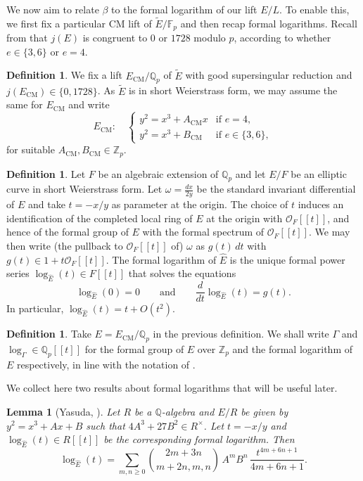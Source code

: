 \documentclass{amsart}
\newcommand{\Qp}{\mathbb{Q}_p}
\newtheorem{lemma}[theorem]{Lemma}
\theoremstyle{definition}
\newtheorem{definition}[theorem]{Definition}
\newcommand{\Z}{\mathbb{Z}}
\newcommand{\Q}{\mathbb{Q}}
\numberwithin{theorem}{section}
\numberwithin{equation}{section}
\begin{document}
We now aim to relate $\beta$ to the formal logarithm of our lift $E/L$. To enable this, we first fix a particular CM lift of $\tilde{E}/\mathbb{F}_p$ and then recap formal logarithms. Recall from  that $j(E)$ is congruent to $0$ or $1728$ modulo $p$, according to whether $e \in \{3,6\}$ or $e=4$.

\begin{definition}
We fix a lift $E_{\mathrm{CM}}/\Qp$ of $\tilde{E}$ with good supersingular reduction and $j(E_{\mathrm{CM}}) \in \{0,1728\}$. As $\tilde{E}$ is in short Weierstrass form, we may assume the same for $E_{\mathrm{CM}}$ and write
\[
E_{\mathrm{CM}}:\quad
\begin{cases}
y^2=x^3+A_{\mathrm{CM}} x & \text{if } e=4,\\
y^2=x^3+B_{\mathrm{CM}}  & \text{if } e \in \{3,6\},
\end{cases}
\]
for suitable $A_{\mathrm{CM}},B_{\mathrm{CM}} \in \Z_p$.
\end{definition}


\begin{definition}\label{def: formal log}
Let $F$ be an algebraic extension of $\Q_p$ and let $E/F$ be an elliptic curve in short Weierstrass form. Let $\omega=\frac{dx}{2y}$ be the standard invariant differential of $E$ and take $t=-x/y$ as parameter at the origin. The choice of $t$ induces an identification of the completed local ring of $E$ at the origin with $\mathcal{O}_F[[t]]$, and hence of the formal group of $E$ with the formal spectrum of $\mathcal{O}_F[[t]]$. We may then write (the pullback to $\mathcal{O}_F[[t]]$ of) $\omega$ as $g(t)\,dt$ with $g(t)\in 1 +t \mathcal{O}_F[[t]]$.
The formal logarithm of $\hat{E}$ is the unique formal power series
$\log_{\widehat{E}}(t)\in F[[t]]$ that solves the equations
\[
\log_{\widehat{E}}(0)=0\qquad \text{and} \qquad \frac{d}{dt}\log_{\widehat{E}}(t)=g(t).
\]
In particular, $\log_{\widehat{E}}(t)=t+O(t^2)$.
\end{definition}

\begin{definition}
    Take $E=E_{\mathrm{CM}}/\Q_p$ in the previous definition. We shall write $\Gamma$ and $\log_\Gamma \in \Q_p[[t]]$ for the formal group of $E$ over $\Z_p$ and the formal logarithm of $E$ respectively, in line with the notation of \cite{Kawachi}.
\end{definition}

We collect here two results about formal logarithms that will be useful later.
\begin{lemma}[Yasuda, {\cite[Corollary 6(a)]{Yasuda}}]\label{lemma: yasuda}
Let $R$ be a $\Q$-algebra and $E/R$ be given by $y^2=x^3+Ax+B$ such that $4A^3+27B^2 \in R^{\times}$.
Let $t=-x/y$ and $\log_{\widehat E}(t) \in R[[t]]$ be the corresponding formal logarithm. Then
\[
\log_{\widehat E}(t)=\sum_{m,n\ge 0}
{2m+3n \choose m+2n, m, n} \,A^mB^n\,
\frac{t^{4m+6n+1}}{4m+6n+1}.
\]
\end{lemma}
\end{document}
